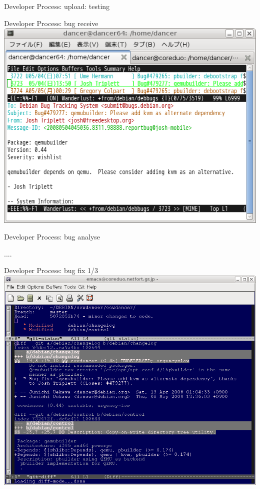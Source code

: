 \documentclass[cjk,dvipdfmx,12pt]{beamer}
\begin{document}
\begin{frame}{Developer Process: upload: testing}
\begin{minipage}{0.4\hsize}
\end{minipage}
\end{frame}

\begin{frame}{Developer Process: bug receive}
 \includegraphics[width=1\hsize]{image200805/bug1.png}
\end{frame}

\begin{frame}{Developer Process: bug analyse}

....
\end{frame}

\begin{frame}{Developer Process: bug fix 1/3}
 \includegraphics[width=1\hsize]{image200805/bug2.png}
\end{frame}
\end{document}
